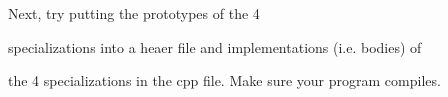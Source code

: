 Next, try putting the prototypes of the 4

specializations into a heaer file and implementations (i.e. bodies) of

the 4 specializations in the cpp file. Make sure your program compiles.

